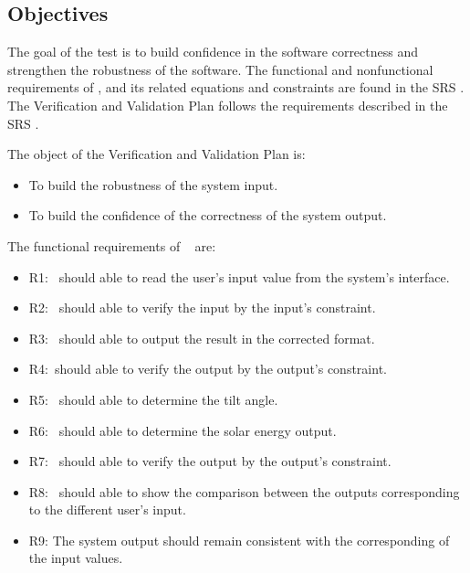 \documentclass[12pt, titlepage]{article}
\begin{document}
\subsection{Objectives}\label{Objectives}

The goal of the test is to build confidence in the software correctness and
strengthen the robustness of the software. The functional and nonfunctional requirements of \progname, and its related equations and constraints are found in the SRS \cite{YS2019}. The Verification and Validation Plan follows the requirements described in the SRS \cite{YS2019}.

The object of the Verification and Validation Plan is:
\noindent \begin{itemize}

\item[ ] To build the robustness of the system input.
\item[ ] To build the confidence of the correctness of the system output.

\noindent \end{itemize}


The functional requirements of  \progname~ are:
\noindent \begin{itemize}

\item[ ]R1: \progname~should able to read the user's input value from the
system's interface.

\item[ ]R2: \progname~should able to verify the input by the input's constraint.

\item[ ]R3: \progname~should able to output the result in
the corrected format.

\item[ ]R4:\progname~should able to verify the output by the output's constraint.

\item[ ]R5: \progname~should able to determine the tilt angle.

\item[ ]R6: \progname~should able to determine the solar energy output.

\item[ ]R7: \progname~should able to verify the output by the output's constraint. 

\item[ ]R8: \progname~should able to show the comparison
between the outputs corresponding to the different user's input.


\item[ ]R9: The system output should remain consistent with
the corresponding of the input values.

\end{itemize}
\end{document}

